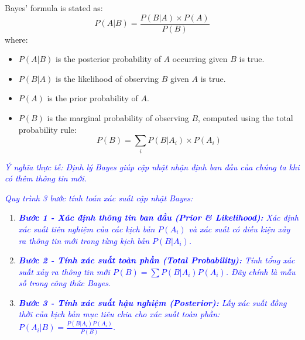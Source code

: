 Bayes' formula is stated as:
\begin{equation}
	P(A|B) = \frac{P(B|A) \times P(A)}{P(B)}
	\label{eq:bayes_formula_m6}
\end{equation}
where:
\begin{itemize}
	\item $P(A|B)$ is the posterior probability of $A$ occurring given $B$ is true.
	\item $P(B|A)$ is the likelihood of observing $B$ given $A$ is true.
	\item $P(A)$ is the prior probability of $A$.
	\item $P(B)$ is the marginal probability of observing $B$, computed using the total probability rule:
	\begin{equation}
		P(B) = \sum_i P(B|A_i) \times P(A_i)
		\label{eq:total_prob_denominator_m6}
	\end{equation}
\end{itemize}
\textcolor{blue}{\textit{Ý nghĩa thực tế: Định lý Bayes giúp cập nhật nhận định ban đầu của chúng ta khi có thêm thông tin mới.}}

\textcolor{blue}{\textit{Quy trình 3 bước tính toán xác suất cập nhật Bayes:}}
\begin{enumerate}
	\item[] \textcolor{blue}{\textit{\textbf{Bước 1 - Xác định thông tin ban đầu (Prior \& Likelihood):} Xác định xác suất tiên nghiệm của các kịch bản $P(A_i)$ và xác suất có điều kiện xảy ra thông tin mới trong từng kịch bản $P(B|A_i)$.}}
	\item[] \textcolor{blue}{\textit{\textbf{Bước 2 - Tính xác suất toàn phần (Total Probability):} Tính tổng xác suất xảy ra thông tin mới $P(B) = \sum P(B|A_i) P(A_i)$. Đây chính là mẫu số trong công thức Bayes.}}
	\item[] \textcolor{blue}{\textit{\textbf{Bước 3 - Tính xác suất hậu nghiệm (Posterior):} Lấy xác suất đồng thời của kịch bản mục tiêu chia cho xác suất toàn phần: $P(A_i|B) = \frac{P(B|A_i) P(A_i)}{P(B)}$.}}
\end{enumerate}

